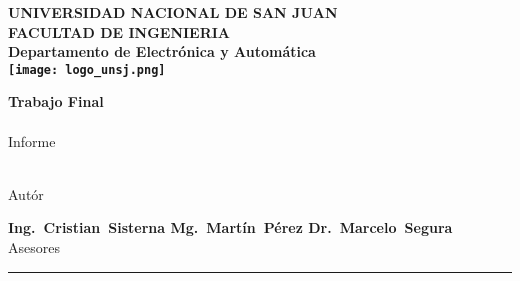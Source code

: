\begin{titlepage}
  \begin{center}
    \begin{Large}
      \textbf{UNIVERSIDAD NACIONAL DE SAN JUAN\\
      \vspace*{0.05in}
      FACULTAD DE INGENIERIA\\
      \vspace*{0.05in}
      Departamento de Electrónica y Automática\\
      \vspace*{0.2in}
      \texttt{[image: logo\_unsj.png]}\\
      \vspace*{\fill}}
    \end{Large}
    \begin{Large}
      \textbf{Trabajo Final\\\MakeUppercase{\thetitle}} \\
      Informe\\
    \end{Large}
    \vspace*{\fill}
    \begin{large}
      \textbf{\theauthor}\\
      Autór\\
    \end{large}
    \vspace*{0.5in}
    \begin{large}
      \textbf{Ing.~Cristian~Sisterna \hspace*{\fill}
      Mg.~Martín~Pérez \hspace*{\fill} Dr.~Marcelo~Segura \\}
      Asesores\\
    \end{large}
    \vspace{\fill}
    \rule{80mm}{0.1mm}\\
    \vspace{.1in}
    \the\year
  \end{center}

\end{titlepage}
